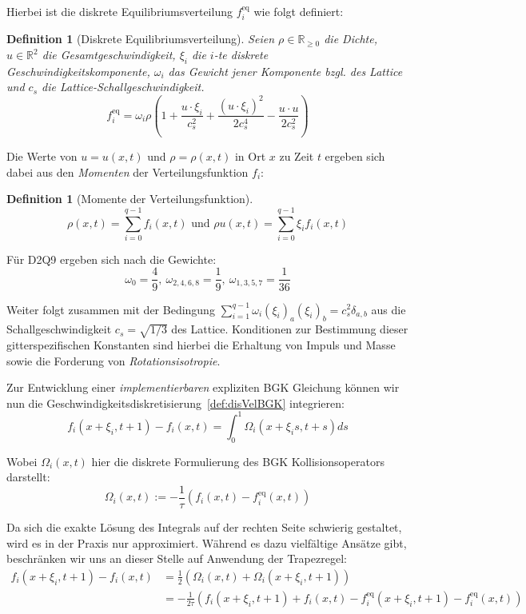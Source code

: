 \documentclass[12pt,a4paper]{scrartcl}
\newtheorem{Definition}[Satz]{Definition}
\numberwithin{equation}{section}
\newcommand{\R}{\mathbb{R}} %
\begin{document}
Hierbei ist die diskrete Equilibriumsverteilung \(f_i^\text{eq}\) wie folgt definiert:

\begin{Definition}[Diskrete Equilibriumsverteilung]
Seien \(\rho \in \R_{\geq 0}\) die Dichte, \(u \in \R^2\) die Gesamtgeschwindigkeit, \(\xi_i\) die \(i\)-te diskrete Geschwindigkeitskomponente, \(\omega_i\) das Gewicht jener Komponente bzgl. des Lattice und \(c_s\) die Lattice-Schallgeschwindigkeit.
\[f_i^\text{eq} = \omega_i \rho \left( 1 + \frac{u \cdot \xi_i}{c_s^2} + \frac{(u \cdot \xi_i)^2}{2c_s^4} - \frac{u \cdot u}{2c_s^2} \right)\]
\end{Definition}

Die Werte von \(u = u(x,t)\) und \(\rho = \rho(x,t)\) in Ort \(x\) zu Zeit \(t\) ergeben sich dabei aus den \emph{Momenten} der Verteilungsfunktion \(f_i\):

\begin{Definition}[Momente der Verteilungsfunktion]
\label{def:Momente}
\[\rho(x,t) = \sum_{i=0}^{q-1} f_i(x,t) \text{ und } \rho u(x,t) = \sum_{i=0}^{q-1} \xi_i f_i(x,t)\]
\end{Definition}

Für D2Q9 ergeben sich nach \cite[Gl.~3.60 bzw. Tab.~3.3]{krueger17} die Gewichte:
\[\omega_0 = \frac{4}{9}, \ \omega_{2,4,6,8} = \frac{1}{9}, \ \omega_{1,3,5,7} = \frac{1}{36}\]

Weiter folgt zusammen mit der Bedingung \(\sum_{i=1}^{q-1} \omega_i (\xi_i)_a (\xi_i)_b = c_s^2 \delta_{a,b}\) aus \cite[Gl.~3.60]{krueger17} die Schallgeschwindigkeit \(c_s = \sqrt{1/3}\) des Lattice. Konditionen zur Bestimmung dieser gitterspezifischen Konstanten sind hierbei die Erhaltung von Impuls und Masse sowie die Forderung von \emph{Rotationsisotropie}.

Zur Entwicklung einer \emph{implementierbaren} expliziten BGK Gleichung können wir nun die Geschwindigkeitsdiskretisierung~\ref{def:disVelBGK} integrieren:
\[ f_i(x+\xi_i, t+1) - f_i(x,t) = \int_0^1 \Omega_i(x+\xi_i s,t+s) ds \]

Wobei \(\Omega_i(x,t)\) hier die diskrete Formulierung des BGK Kollisionsoperators darstellt:
\[\Omega_i(x,t) := -\frac{1}{\tau} ( f_i(x,t) - f_i^\text{eq}(x, t) )\]

Da sich die exakte Lösung des Integrals auf der rechten Seite schwierig gestaltet, wird es in der Praxis nur approximiert. Während es dazu vielfältige Ansätze gibt, beschränken wir uns an dieser Stelle auf Anwendung der Trapezregel:
\begin{align*}
f_i(x+\xi_i,t+1) - f_i(x,t) &= \frac{1}{2} \left( \Omega_i(x,t) + \Omega_i(x+\xi_i,t+1) \right) \\
&= -\frac{1}{2\tau} \left( f_i(x+\xi_i,t+1) + f_i(x,t) - f_i^\text{eq}(x+\xi_i,t+1) - f_i^\text{eq}(x,t) \right)
\end{align*}
\end{document}
